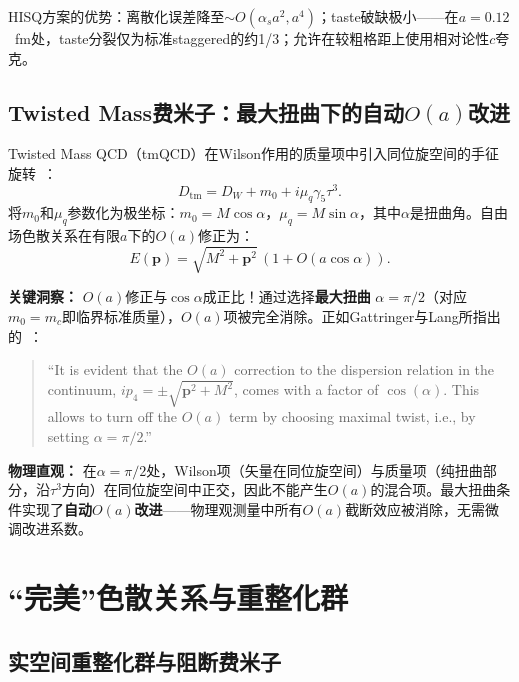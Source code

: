 \documentclass[12pt,a4paper]{ctexart}
\theoremstyle{definition}
\begin{document}
HISQ方案的优势：离散化误差降至$\sim O(\alpha_s a^2, a^4)$；taste破缺极小——在$a = 0.12$~fm处，taste分裂仅为标准staggered的约1/3；允许在较粗格距上使用相对论性$c$夸克。

\subsection{Twisted Mass费米子：最大扭曲下的自动$O(a)$改进}

Twisted Mass QCD（tmQCD）在Wilson作用的质量项中引入同位旋空间的手征旋转~\cite{GattringerLang2010}：
\begin{equation}
    D_{\text{tm}} = D_W + m_0 + i\mu_q \gamma_5 \tau^3.
\end{equation}
将$m_0$和$\mu_q$参数化为极坐标：$m_0 = M\cos\alpha$，$\mu_q = M\sin\alpha$，其中$\alpha$是扭曲角。自由场色散关系在有限$a$下的$O(a)$修正为：
\begin{equation}
    E(\mathbf{p}) = \sqrt{M^2 + \mathbf{p}^2}\,(1 + O(a\cos\alpha)).
\end{equation}

\textbf{关键洞察：} $O(a)$修正与$\cos\alpha$成正比！通过选择\textbf{最大扭曲} $\alpha = \pi/2$（对应$m_0 = m_c$即临界标准质量），$O(a)$项被完全消除。正如Gattringer与Lang所指出的~\cite{GattringerLang2010}：
\begin{quote}
``It is evident that the $O(a)$ correction to the dispersion relation in the continuum, $ip_4 = \pm\sqrt{\mathbf{p}^2 + M^2}$, comes with a factor of $\cos(\alpha)$. This allows to turn off the $O(a)$ term by choosing maximal twist, i.e., by setting $\alpha = \pi/2$.''
\end{quote}

\textbf{物理直观：} 在$\alpha = \pi/2$处，Wilson项（矢量在同位旋空间）与质量项（纯扭曲部分，沿$\tau^3$方向）在同位旋空间中正交，因此不能产生$O(a)$的混合项。最大扭曲条件实现了\textbf{自动$O(a)$改进}——物理观测量中所有$O(a)$截断效应被消除，无需微调改进系数。

\section{``完美''色散关系与重整化群}

\subsection{实空间重整化群与阻断费米子}
\end{document}
